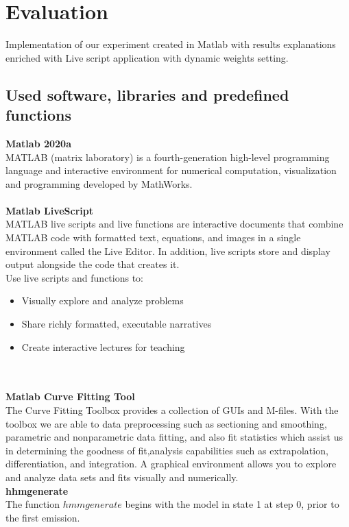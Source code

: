 \chapter{Evaluation} \label{evaluation}
Implementation of our experiment created in Matlab with results explanations enriched with Live script application with dynamic weights setting.
\section{Used software, libraries and predefined functions} \label{subsec:libraries}
\textbf{Matlab 2020a}\\
MATLAB (matrix laboratory) is a fourth-generation high-level programming language and interactive environment for numerical
computation, visualization and programming developed by MathWorks.\\
\\
\textbf{Matlab LiveScript}~\cite{livescript}\\
MATLAB live scripts and live functions are interactive documents that combine MATLAB code with formatted text, equations,
and images in a single environment called the Live Editor.
In addition, live scripts store and display output alongside the code that creates it.\\
Use live scripts and functions to:\\
\begin{itemize}
    \item Visually explore and analyze problems
    \item Share richly formatted, executable narratives
    \item Create interactive lectures for teaching
\end{itemize}\\
\\
\textbf{Matlab Curve Fitting Tool}\\
The Curve Fitting Toolbox provides a collection of GUIs and M-files.
With the toolbox we are able to data preprocessing such as sectioning and smoothing, parametric and nonparametric data fitting,
and also fit statistics which assist us in determining the goodness of fit,analysis capabilities such as extrapolation, differentiation, and integration.
A graphical environment allows you to explore and analyze data sets and fits visually and numerically.\\
\textbf{hhmgenerate}~\cite{hhmgenerate}\\
The function $hmmgenerate$ begins with the model in state 1 at step 0, prior to the first emission.
